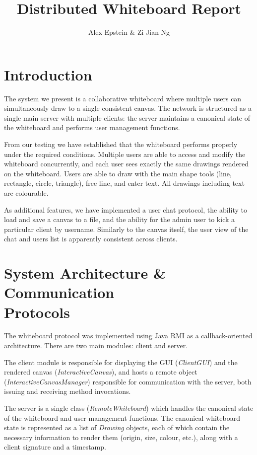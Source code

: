 \documentclass[12pt,a4paper]{article}
\title{Distributed Whiteboard Report}
\author{Alex Epstein \& Zi Jian Ng}
\begin{document}
\maketitle


\section{Introduction}

The system we present is a collaborative whiteboard where multiple users can simultaneously draw to a single consistent canvas. The network is structured as a single main server with multiple clients: the server maintains a canonical state of the whiteboard and performs user management functions.

From our testing we have established that the whiteboard performs properly under the required conditions. Multiple users are able to access and modify the whiteboard concurrently, and each user sees exactly the same drawings rendered on the whiteboard. Users are able to draw with the main shape tools (line, rectangle, circle, triangle), free line, and enter text. All drawings including text are colourable. 

As additional features, we have implemented a user chat protocol, the ability to load and save a canvas to a file, and the ability for the admin user to kick a particular client by username. Similarly to the canvas itself, the user view of the chat and users list is apparently consistent across clients. 

\section{System Architecture \& Communication \\Protocols}

The whiteboard protocol was implemented using Java RMI as a callback-oriented architecture. There are two main modules: client and server. 

The client module is responsible for displaying the GUI (\textit{ClientGUI}) and the rendered canvas (\textit{InteractiveCanvas}), and hosts a remote object (\textit{InteractiveCanvasManager}) responsible for communication with the server, both issuing and receiving method invocations. 

The server is a single class (\textit{RemoteWhiteboard}) which handles the canonical state of the whiteboard and user management functions. The canonical whiteboard state is represented as a list of \textit{Drawing} objects, each of which contain the necessary information to render them (origin, size, colour, etc.), along with a client signature and a timestamp. 
\end{document}

